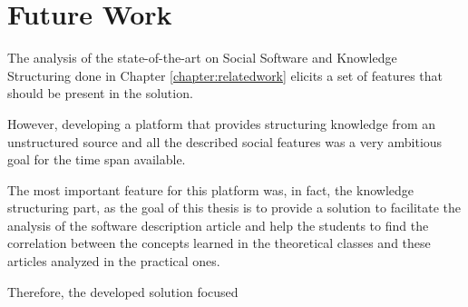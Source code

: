 
\chapter{Future Work}
\label{chapter:futureWork}

The analysis of the state-of-the-art on Social Software and Knowledge Structuring done in Chapter \ref{chapter:relatedwork} elicits a set of features that should be present in the solution.

However, developing a platform that provides structuring knowledge from an unstructured source and all the described social features was a very ambitious goal for the time span available. 

The most important feature for this platform was, in fact, the knowledge structuring part, as the goal of this thesis is to provide a solution to facilitate the analysis of the software description article and help the students to find the correlation between the concepts learned in the theoretical classes and these articles analyzed in the practical ones.

Therefore, the developed solution focused 
